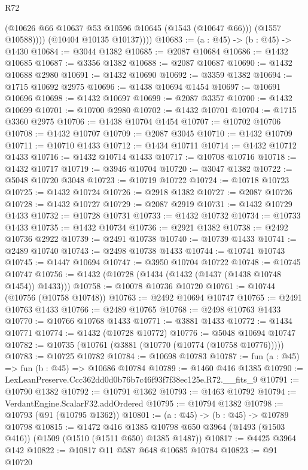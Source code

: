 \begin{lexlean}{R72}
\begin{coremodule}
                (@10626 @66 @10637 @53 @10596 @10645 (@1543 (@10647 @66)))
                (@1557 @10588))))
          (@10404 @10135 @10137))))
@10683 := (a : @45) -> (b : @45) -> @1430
@10684 := @3044 @1382
@10685 := @2087 @10684
@10686 := @1432 @10685
@10687 := @3356 @1382
@10688 := @2087 @10687
@10690 := @1432 @10688 @2980
@10691 := @1432 @10690
@10692 := @3359 @1382
@10694 := @1715 @10692 @2975
@10696 := @1438 @10694 @1454
@10697 := @10691 @10696
@10698 := @1432 @10697
@10699 := @2087 @3357
@10700 := @1432 @10699
@10701 := @10700 @2980
@10702 := @1432 @10701
@10704 := @1715 @3360 @2975
@10706 := @1438 @10704 @1454
@10707 := @10702 @10706
@10708 := @1432 @10707
@10709 := @2087 @3045
@10710 := @1432 @10709
@10711 := @10710 @1433
@10712 := @1434 @10711
@10714 := @1432 @10712 @1433
@10716 := @1432 @10714 @1433
@10717 := @10708 @10716
@10718 := @1432 @10717
@10719 := @3946 @10704
@10720 := @3047 @1382
@10722 := @5048 @10720 @3048
@10723 := @10719 @10722
@10724 := @10718 @10723
@10725 := @1432 @10724
@10726 := @2918 @1382
@10727 := @2087 @10726
@10728 := @1432 @10727
@10729 := @2087 @2919
@10731 := @1432 @10729 @1433
@10732 := @10728 @10731
@10733 := @1432 @10732
@10734 := @10733 @1433
@10735 := @1432 @10734
@10736 := @2921 @1382
@10738 := @2492 @10736 @2922
@10739 := @2491 @10738
@10740 := @10739 @1433
@10741 := @2489 @10740
@10743 := @2498 @10738 @1433
@10744 := @10741 @10743
@10745 := @1447 @10694
@10747 := @3950 @10704 @10722
@10748 := @10745 @10747
@10756 := @1432 (@10728 (@1434 (@1432 (@1437 (@1438 @10748 @1454)) @1433)))
@10758 := @10078 @10736 @10720
@10761 := @10744 (@10756 (@10758 @10748))
@10763 := @2492 @10694 @10747
@10765 := @2491 @10763 @1433
@10766 := @2489 @10765
@10768 := @2498 @10763 @1433
@10770 := @10766 @10768 @1433
@10771 := @3881 @1433
@10772 := @1434 @10771
@10774 := @1432 (@10728 @10772)
@10776 := @5048 @10694 @10747
@10782 := @10735 (@10761 (@3881 (@10770 (@10774 (@10758 @10776)))))
@10783 := @10725 @10782
@10784 := @10698 @10783
@10787 := fun (a : @45) => fun (b : @45) => @10686 @10784
@10789 := @1460 @416 @1385
@10790 := LexLeanPreserve.Ccc362dd0d0b76b7c46f93f7f38ec125e.R72.__fits_9
@10791 := @10790 @1382
@10792 := @10791 @1362
@10793 := @1463 @10792
@10794 := VerdantEngine.ScalarF32.addOrdered
@10795 := @10794 @1382
@10798 := @10793 (@91 (@10795 @1362))
@10801 := (a : @45) -> (b : @45) -> @10789 @10798
@10815 := @1472
    @416
    @1385
    @10798
    @650
    @3964
    (@1493 (@1503 @416))
    (@1509 (@1510 (@1511 @650) @1385 @1487))
@10817 := @4425 @3964 @142
@10822 := @10817 @11 @587 @648 @10685 @10784
@10823 := @91 @10720

\end{coremodule}
\end{lexlean}
